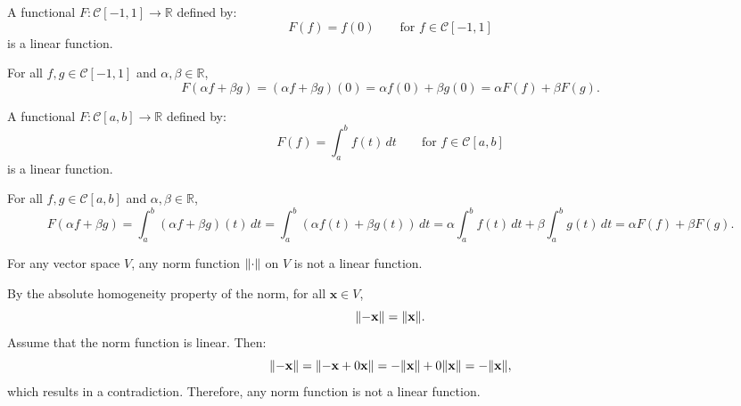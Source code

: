 \documentclass{huhtakm-template-book-v2}
\begin{document}
    \begin{eg}
        A functional $F:\mathcal{C}[-1,1]\to\mathbb{R}$ defined by:
        \begin{equation*}
            F(f)=f(0) \qquad \text{for } f\in\mathcal{C}[-1,1]
        \end{equation*}
        is a linear function.
    \end{eg}
    \begin{proofing}
        For all $f,g\in\mathcal{C}[-1,1]$ and $\alpha,\beta\in\mathbb{R}$,
        \begin{equation*}
            F(\alpha f+\beta g)=(\alpha f+\beta g)(0)=\alpha f(0)+\beta g(0)=\alpha F(f)+\beta F(g).
        \end{equation*}
    \end{proofing}
    \begin{eg}
        A functional $F:\mathcal{C}[a,b]\to\mathbb{R}$ defined by:
        \begin{equation*}
            F(f)=\int_{a}^{b}f(t)\,dt \qquad \text{for } f\in\mathcal{C}[a,b]
        \end{equation*}
        is a linear function.
    \end{eg}
    \begin{proofing}
        For all $f,g\in\mathcal{C}[a,b]$ and $\alpha,\beta\in\mathbb{R}$,
        \begin{equation*}
            F(\alpha f+\beta g)=\int_{a}^{b}(\alpha f+\beta g)(t)\,dt=\int_{a}^{b}(\alpha f(t)+\beta g(t))\,dt=\alpha\int_{a}^{b}f(t)\,dt+\beta\int_{a}^{b}g(t)\,dt=\alpha F(f)+\beta F(g).
        \end{equation*}
    \end{proofing}
    \begin{thm}
        For any vector space $V$, any norm function $\lVert{\cdot}\rVert$ on $V$ is not a linear function.
    \end{thm}
    \begin{proofing}
        By the absolute homogeneity property of the norm, for all $\mathbf{x}\in V$,
        \begin{equation*}
            \lVert{-\mathbf{x}}\rVert=\lVert{\mathbf{x}}\rVert.
        \end{equation*}
        Assume that the norm function is linear. Then:
        \begin{equation*}
            \lVert{-\mathbf{x}}\rVert=\lVert{-\mathbf{x}+0\mathbf{x}}\rVert=-\lVert{\mathbf{x}}\rVert+0\lVert{\mathbf{x}}\rVert=-\lVert{\mathbf{x}}\rVert,
        \end{equation*}
        which results in a contradiction. Therefore, any norm function is not a linear function.
    \end{proofing}
\end{document}
